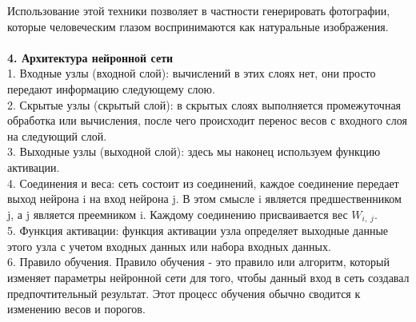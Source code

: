 \documentclass{article}
\begin{document}
    Использование этой техники позволяет в частности генерировать фотографии, которые человеческим глазом воспринимаются как натуральные изображения.  \\ \\
    \textbf{4. Архитектура нейронной сети}\\
    1. Входные узлы (входной слой): вычислений в этих слоях нет, они просто передают информацию следующему слою.\\
    2. Скрытые узлы (скрытый слой): в скрытых слоях выполняется промежуточная обработка или вычисления, после чего происходит перенос весов с входного слоя на следующий слой.\\
    3. Выходные узлы (выходной слой): здесь мы наконец используем функцию активации.\\
    4. Соединения и веса: сеть состоит из соединений, каждое соединение передает выход нейрона i на вход нейрона j. В этом смысле i является предшественником j, а j является преемником i. Каждому соединению присваивается вес $W_{i,\;j}$.\\
    5. Функция активации: функция активации узла определяет выходные данные этого узла с учетом входных данных или набора входных данных. \\
    6. Правило обучения. Правило обучения - это правило или алгоритм, который изменяет параметры нейронной сети для того, чтобы данный вход в сеть создавал предпочтительный результат. Этот процесс обучения обычно сводится к изменению весов и порогов.\\
    
\end{document}
